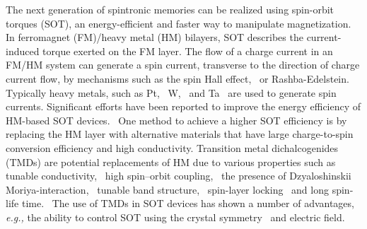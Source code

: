 \documentclass[journal=jacsat,manuscript=article]{achemso}
\begin{document}
The next generation of spintronic memories can be realized using spin-orbit torques (SOT), an energy-efficient and faster way to manipulate magnetization.~\cite{manchon2019current}
In ferromagnet (FM)/heavy metal (HM) bilayers, SOT describes the current-induced torque exerted on the FM layer. The flow of a charge current in an FM/HM system can generate a spin current, transverse to the direction of charge current flow, by mechanisms such as the spin Hall effect,~\cite{dyakonov1971current} or Rashba-Edelstein.~\cite{bychkov1984properties} Typically heavy metals, such as Pt,~\cite{liu2011spin,skowronski2019determination} W,~\cite{pai2012spin,bansal2018large,skowronski2019determination} and Ta~\cite{liu2012spin,kumar2018large} are used to generate spin currents.
Significant efforts have been reported to improve the energy efficiency of HM-based SOT devices.~\cite{demasius2016enhanced,kumar2021large,behera2022energy} One method to achieve a higher SOT efficiency is by replacing the HM layer with alternative materials that have large charge-to-spin conversion efficiency and high conductivity.
Transition metal dichalcogenides (TMDs) are potential replacements of HM due to various properties such as tunable conductivity,~\cite{chen2014thickness,behera2022tunable} high spin–orbit coupling,~\cite{zhu2011giant,bansal2019extrinsic,bangar2022large} the presence of Dzyaloshinskii Moriya-interaction,~\cite{kumar2020direct} tunable band structure,~\cite{kang2017universal,nugera2022bandgap} spin-layer locking~\cite{yao2017direct} and long spin-life time.~\cite{liang2017electrical} The use of TMDs in SOT devices has shown a number of advantages, \textit{e.g.,} the ability to control SOT using the crystal symmetry~\cite{macneill2017control, kao2022deterministic,zhao2020unconventional} and electric field.~\cite{lv2018electric}

\end{document}
